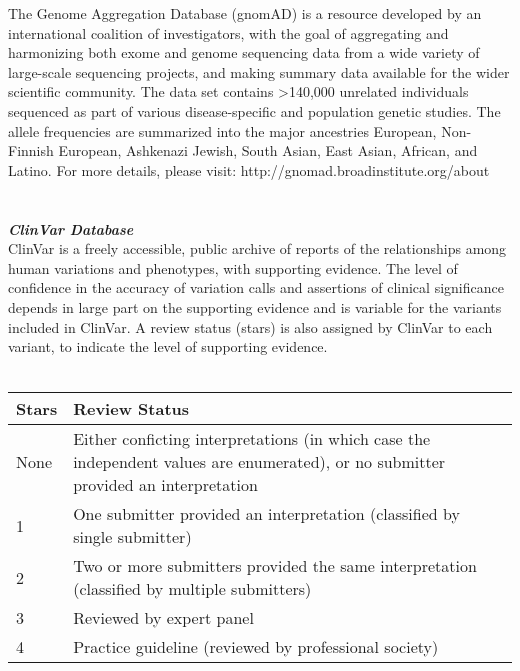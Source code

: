 The Genome Aggregation Database (gnomAD) is a resource developed by an international coalition of investigators, with the goal of aggregating and harmonizing both exome and genome sequencing data from a wide variety of large-scale sequencing projects, and making summary data available for the wider scientific community. The data set contains \textgreater140,000 unrelated individuals sequenced as part of various disease-specific and population genetic studies. The allele frequencies are summarized into the major ancestries European, Non-Finnish European, Ashkenazi Jewish,  South Asian, East Asian, African, and Latino. For more details, please visit: http://gnomad.broadinstitute.org/about
\\ \\ \\

\newpage
{\large \textbf{\textit{ClinVar Database}}}
\\
ClinVar is a freely accessible, public archive of reports of the relationships among human variations and phenotypes, with supporting evidence. The level of confidence in the accuracy of variation calls and assertions of clinical significance depends in large part on the supporting evidence and is variable for the variants included in ClinVar. A review status (stars) is also assigned by ClinVar to each variant, to indicate the level of supporting evidence. 
\\ \\

\begin{small}
\begin{tabular}{ |p{1cm}|p{15cm}|  }
\hline
\textbf{Stars} & \textbf{Review Status} \\
\hline
None & Either conficting interpretations (in which case the independent values are enumerated), or no submitter provided an interpretation \\
1 & One submitter provided an interpretation (classified by single submitter) \\
2 & Two or more submitters provided the same interpretation (classified by multiple submitters) \\
3 & Reviewed by expert panel \\
4 & Practice guideline (reviewed by professional society) \\
\hline
\end{tabular}
\end{small}
\\ \\ \\

